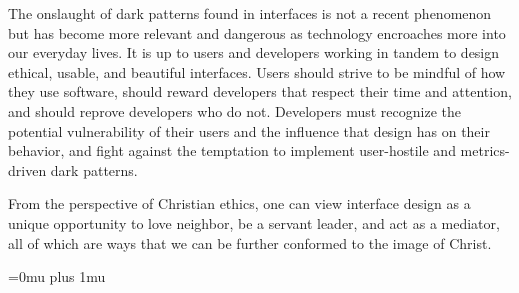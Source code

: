 \documentclass[12pt, oneside]{article}
\begin{document}
The onslaught of dark patterns found in interfaces is not a recent phenomenon but has become more relevant and dangerous as technology encroaches more into our everyday lives. It is up to users and developers working in tandem to design ethical, usable, and beautiful interfaces. Users should strive to be mindful of how they use software, should reward developers that respect their time and attention, and should reprove developers who do not. Developers must recognize the potential vulnerability of their users and the influence that design has on their behavior, and fight against the temptation to implement user-hostile and metrics-driven dark patterns.

From the perspective of Christian ethics, one can view interface design as a unique opportunity to love neighbor, be a servant leader, and act as a mediator, all of which are ways that we can be further conformed to the image of Christ.

\newpage

\begingroup
\raggedright
\Urlmuskip=0mu plus 1mu\relax

 


\endgroup
\end{document}
